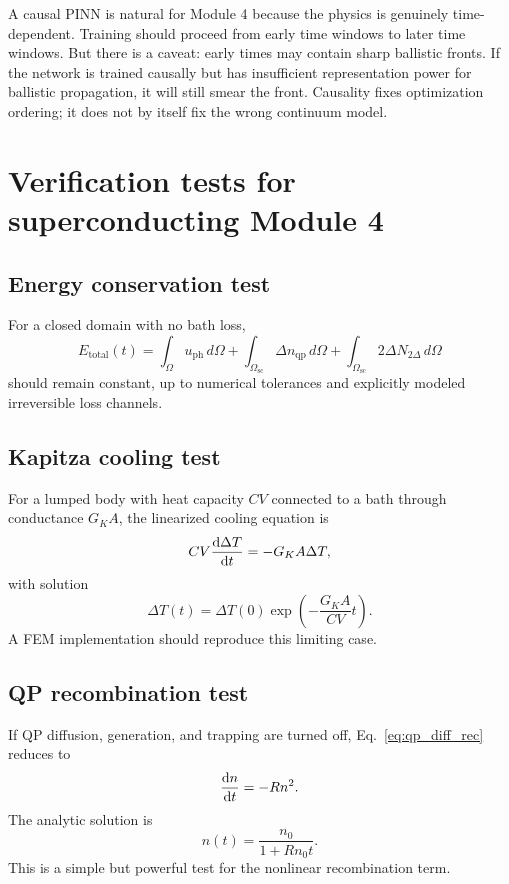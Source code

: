 \documentclass[11pt]{article}
\newcommand{\nqp}{n_{\mathrm{qp}}}
\begin{document}
A causal PINN is natural for Module 4 because the physics is genuinely time-dependent. Training should proceed from early time windows to later time windows. But there is a caveat: early times may contain sharp ballistic fronts. If the network is trained causally but has insufficient representation power for ballistic propagation, it will still smear the front. Causality fixes optimization ordering; it does not by itself fix the wrong continuum model.

\section{Verification tests for superconducting Module 4}

\subsection{Energy conservation test}

For a closed domain with no bath loss,
\begin{equation}
E_{\mathrm{total}}(t)=\int_\Omega u_{\mathrm{ph}}\,d\Omega
+\int_{\Omega_{\mathrm{sc}}}\Delta \nqp\,d\Omega
+\int_{\Omega_{\mathrm{sc}}}2\Delta N_{2\Delta}\,d\Omega
\end{equation}
should remain constant, up to numerical tolerances and explicitly modeled irreversible loss channels.

\subsection{Kapitza cooling test}

For a lumped body with heat capacity \(C V\) connected to a bath through conductance \(G_KA\), the linearized cooling equation is
\begin{equation}
CV\dv{\Delta T}{t}=-G_KA\Delta T,
\end{equation}
with solution
\begin{equation}
\Delta T(t)=\Delta T(0)\exp\left(-\frac{G_KA}{CV}t\right).
\end{equation}
A FEM implementation should reproduce this limiting case.

\subsection{QP recombination test}

If QP diffusion, generation, and trapping are turned off, Eq.~\eqref{eq:qp_diff_rec} reduces to
\begin{equation}
\dv{n}{t}=-Rn^2.
\end{equation}
The analytic solution is
\begin{equation}
n(t)=\frac{n_0}{1+Rn_0t}.
\end{equation}
This is a simple but powerful test for the nonlinear recombination term.
\end{document}
